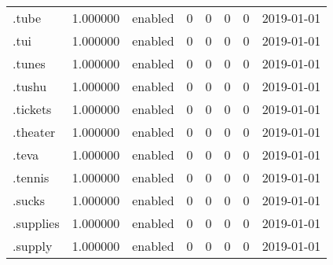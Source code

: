 \begin{tabular}{lrlrrrrl}
.tube                     &          1.000000 &         enabled &                           0 &                           0 &                           0 &                   0 &           2019-01-01 \\
.tui                      &          1.000000 &         enabled &                           0 &                           0 &                           0 &                   0 &           2019-01-01 \\
.tunes                    &          1.000000 &         enabled &                           0 &                           0 &                           0 &                   0 &           2019-01-01 \\
.tushu                    &          1.000000 &         enabled &                           0 &                           0 &                           0 &                   0 &           2019-01-01 \\
.tickets                  &          1.000000 &         enabled &                           0 &                           0 &                           0 &                   0 &           2019-01-01 \\
.theater                  &          1.000000 &         enabled &                           0 &                           0 &                           0 &                   0 &           2019-01-01 \\
.teva                     &          1.000000 &         enabled &                           0 &                           0 &                           0 &                   0 &           2019-01-01 \\
.tennis                   &          1.000000 &         enabled &                           0 &                           0 &                           0 &                   0 &           2019-01-01 \\
.sucks                    &          1.000000 &         enabled &                           0 &                           0 &                           0 &                   0 &           2019-01-01 \\
.supplies                 &          1.000000 &         enabled &                           0 &                           0 &                           0 &                   0 &           2019-01-01 \\
.supply                   &          1.000000 &         enabled &                           0 &                           0 &                           0 &                   0 &           2019-01-01 \\

\end{tabular}
